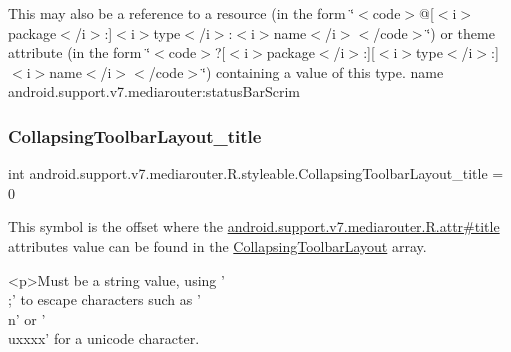 This may also be a reference to a resource (in the form \char`\"{}$<$code$>$@\mbox{[}$<$i$>$package$<$/i$>$\+:\mbox{]}$<$i$>$type$<$/i$>$\+:$<$i$>$name$<$/i$>$$<$/code$>$\char`\"{}) or theme attribute (in the form \char`\"{}$<$code$>$?\mbox{[}$<$i$>$package$<$/i$>$\+:\mbox{]}\mbox{[}$<$i$>$type$<$/i$>$\+:\mbox{]}$<$i$>$name$<$/i$>$$<$/code$>$\char`\"{}) containing a value of this type.  name android.\+support.\+v7.\+mediarouter\+:status\+Bar\+Scrim \mbox{\label{classandroid_1_1support_1_1v7_1_1mediarouter_1_1R_1_1styleable_ab2ba0d03f6955916a430e0ac530551d2}} 
\subsubsection{\texorpdfstring{Collapsing\+Toolbar\+Layout\+\_\+title}{CollapsingToolbarLayout\_title}}
{\footnotesize\ttfamily int android.\+support.\+v7.\+mediarouter.\+R.\+styleable.\+Collapsing\+Toolbar\+Layout\+\_\+title = 0\hspace{0.3cm}{\ttfamily [static]}}

This symbol is the offset where the \hyperlink{classandroid_1_1support_1_1v7_1_1mediarouter_1_1R_1_1attr_a63e7cf1dd1a79d708a4d99098363d8bd}{android.\+support.\+v7.\+mediarouter.\+R.\+attr\#title} attribute\textquotesingle{}s value can be found in the \hyperlink{classandroid_1_1support_1_1v7_1_1mediarouter_1_1R_1_1styleable_aae2cb4975e9b9a19d129888f497cc386}{Collapsing\+Toolbar\+Layout} array.

\begin{DoxyVerb}      <p>Must be a string value, using '\\;' to escape characters such as '\\n' or '\\uxxxx' for a unicode character.
\end{DoxyVerb}
 

